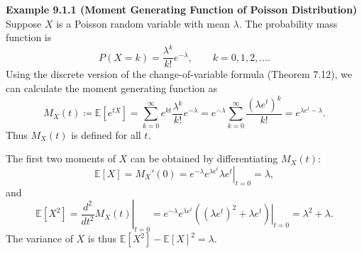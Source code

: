 \textbf{Example 9.1.1 (Moment Generating Function of Poisson Distribution)} \\
Suppose $X$ is a Poisson random variable with mean $\lambda$. The probability mass function is
\[
P(X=k)=\frac{\lambda^k}{k!}e^{-\lambda}, \qquad k=0,1,2,\ldots.
\]
Using the discrete version of the change-of-variable formula (Theorem 7.12), we can calculate the moment generating function as
\[
M_X(t)\coloneqq \mathbb{E}[e^{tX}]
=\sum_{k=0}^{\infty}e^{kt}\frac{\lambda^k}{k!}e^{-\lambda}
=e^{-\lambda}\sum_{k=0}^{\infty}\frac{(\lambda e^t)^k}{k!}
=e^{\lambda e^t-\lambda}.
\]
Thus $M_X(t)$ is defined for all $t$.

The first two moments of $X$ can be obtained by differentiating $M_X(t)$:
\[
\mathbb{E}[X] = M_X'(0)
=\left.e^{-\lambda}e^{\lambda e^t}\lambda e^t\right|_{t=0}
=\lambda,
\]
and
\[
\mathbb{E}[X^2]
=\left.\frac{d^2}{dt^2}M_X(t)\right|_{t=0}
=\left.e^{-\lambda}e^{\lambda e^t}\left((\lambda e^t)^2+\lambda e^t\right)\right|_{t=0}
=\lambda^2+\lambda.
\]
The variance of $X$ is thus $\mathbb{E}[X^2]-\mathbb{E}[X]^2=\lambda$.
